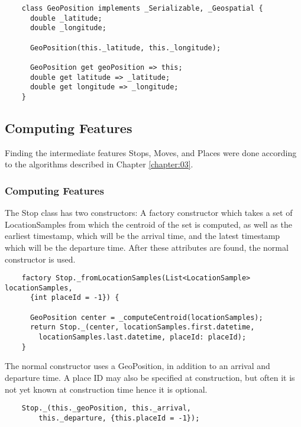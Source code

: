 \begin{verbatim}
    class GeoPosition implements _Serializable, _Geospatial {
      double _latitude;
      double _longitude;
    
      GeoPosition(this._latitude, this._longitude);
    
      GeoPosition get geoPosition => this;
      double get latitude => _latitude;
      double get longitude => _longitude;
    }
\end{verbatim}


\subsection{Computing Features}
Finding the intermediate features Stops, Moves, and Places were done according to the algorithms described in Chapter \ref{chapter:03}. 

\subsubsection{Computing Features}
The Stop class has two constructors: A factory constructor which takes a set of LocationSamples from which the centroid of the set is computed, as well as the earliest timestamp, which will be the arrival time, and the latest timestamp which will be the departure time. After these attributes are found, the normal constructor is used.

\begin{verbatim}
    factory Stop._fromLocationSamples(List<LocationSample> locationSamples,
      {int placeId = -1}) {
      
      GeoPosition center = _computeCentroid(locationSamples);
      return Stop._(center, locationSamples.first.datetime,
        locationSamples.last.datetime, placeId: placeId);
    }
\end{verbatim}

The normal constructor uses a GeoPosition, in addition to an arrival and departure time. A place ID may also be specified at construction, but often it is not yet known at construction time hence it is optional.

\begin{verbatim}
    Stop._(this._geoPosition, this._arrival, 
        this._departure, {this.placeId = -1});
\end{verbatim}

